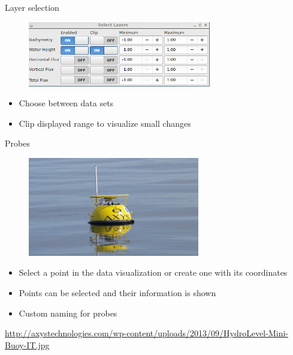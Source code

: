 \documentclass[shortpres,usenames,dvipsnames]{beamer}
\begin{document}
\begin{frame}[fragile]{Layer selection}
	\begin{figure}
		\includegraphics[clip, width=80mm]{img/layerselect.png}
	\end{figure}
	\begin{itemize}
		\item Choose between data sets
		\item Clip displayed range to visualize small changes
	\end{itemize}
\end{frame}

\begin{frame}[fragile]{Probes}
	\begin{figure}
		\includegraphics[clip, width=75mm]{img/Buoy.jpg}
	\end{figure}
	\begin{itemize}
		\item Select a point in the data visualization or create one with its coordinates
		\item Points can be selected and their information is shown
		\item Custom naming for probes
	\end{itemize}
	\flushleft
	{\fontsize{5}{5} \selectfont \url{http://axystechnologies.com/wp-content/uploads/2013/09/HydroLevel-Mini-Buoy-IT.jpg}}
\end{frame}
\end{document}
